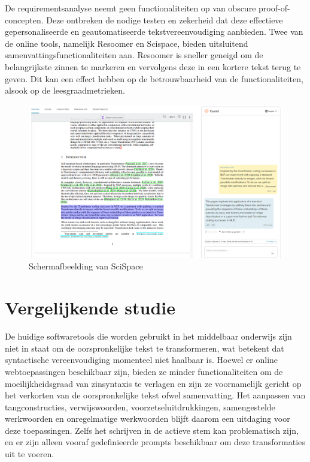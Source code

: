
De requirementsanalyse neemt geen functionaliteiten op van obscure proof-of-concepten. Deze ontbreken de nodige testen en zekerheid dat deze effectieve gepersonaliseerde en geautomatiseerde tekstvereenvoudiging aanbieden. Twee van de online tools, namelijk Resoomer en Scispace, bieden uitsluitend samenvattingsfunctionaliteiten aan. Resoomer is sneller geneigd om de belangrijkste zinnen te markeren en vervolgens deze in een kortere tekst terug te geven. Dit kan een effect hebben op de betrouwbaarheid van de functionaliteiten, alsook op de leesgraadmetrieken.

\begin{figure}[H]
	\includegraphics{img/typeset-example.png}
	\caption{Schermafbeelding van SciSpace}
\end{figure}






\section{Vergelijkende studie}


De huidige softwaretools die worden gebruikt in het middelbaar onderwijs zijn niet in staat om de oorspronkelijke tekst te transformeren, wat betekent dat syntactische vereenvoudiging momenteel niet haalbaar is. Hoewel er online webtoepassingen beschikbaar zijn, bieden ze minder functionaliteiten om de moeilijkheidsgraad van zinsyntaxis te verlagen en zijn ze voornamelijk gericht op het verkorten van de oorspronkelijke tekst ofwel samenvatting. Het aanpassen van tangconstructies, verwijswoorden, voorzetseluitdrukkingen, samengestelde werkwoorden en onregelmatige werkwoorden blijft daarom een uitdaging voor deze toepassingen. Zelfs het schrijven in de actieve stem kan problematisch zijn, en er zijn alleen vooraf gedefinieerde prompts beschikbaar om deze transformaties uit te voeren.

